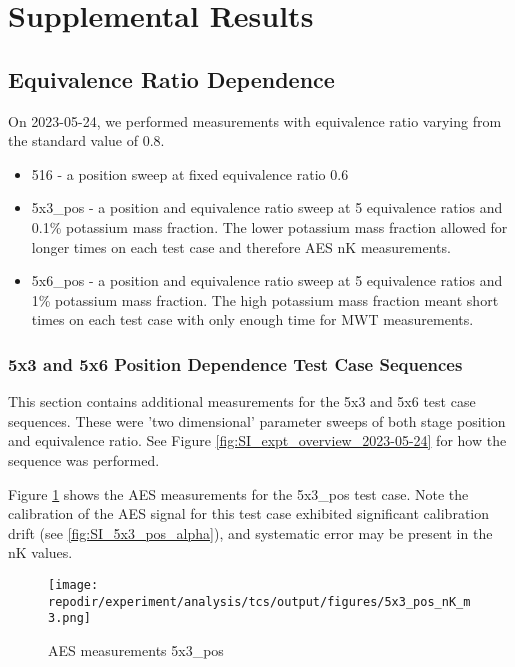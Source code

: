 \section{Supplemental Results}


\clearpage

\subsection{Equivalence Ratio Dependence}

On 2023-05-24, we performed measurements with equivalence ratio varying from the standard value of 0.8. 

\begin{itemize}
    \item 516 - a position sweep at fixed equivalence ratio 0.6
    \item 5x3\_pos - a position and equivalence ratio sweep at 5 equivalence ratios and 0.1\% potassium mass fraction. The lower potassium mass fraction allowed for longer times on each test case and therefore AES nK measurements. 
    \item 5x6\_pos - a position and equivalence ratio sweep at 5 equivalence ratios and 1\% potassium mass fraction. The high potassium mass fraction meant short times on each test case with only enough time for MWT measurements. 
\end{itemize}
 
\subsubsection{5x3 and 5x6 Position Dependence Test Case Sequences}

This section contains additional measurements for the 5x3 and 5x6 test case sequences. These were 'two dimensional' parameter sweeps of both stage position and equivalence ratio. See Figure \ref{fig:SI_expt_overview_2023-05-24} for how the sequence was performed. 

Figure \ref{fig:SI_5x3_pos_nK_m3} shows the AES measurements for the 5x3\_pos test case. Note the calibration of the AES signal for this test case exhibited significant calibration drift (see \ref{fig:SI_5x3_pos_alpha}), and systematic error may be present in the nK values. 

\begin{figure}[]
\centering
\texttt{[image: \\repodir/experiment/analysis/tcs/output/figures/5x3\_pos\_nK\_m3.png]}
\caption{AES measurements 5x3\_pos}
\label{fig:SI_5x3_pos_nK_m3}
\end{figure}

